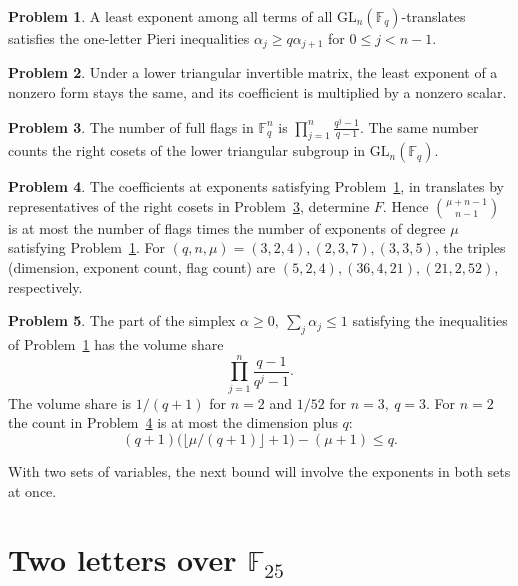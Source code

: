 \documentclass[reqno]{amsart}
\theoremstyle{plain}
\theoremstyle{definition}
\newtheorem{problem}{Problem}[section]
\theoremstyle{remark}
\newcommand{\F}{\mathbb{F}}
\newcommand{\GL}{\mathrm{GL}}
\begin{document}
\begin{problem}\label{pr:pieri-one}
A least exponent among all terms of all \(\GL_n(\F_q)\)-translates satisfies the one-letter Pieri inequalities \(\alpha_j\ge q\alpha_{j+1}\) for \(0\le j<n-1\).
\end{problem}

\begin{problem}\label{pr:triangular}
Under a lower triangular invertible matrix, the least exponent of a nonzero form stays the same, and its coefficient is multiplied by a nonzero scalar.
\end{problem}

\begin{problem}\label{pr:flags}
The number of full flags in \(\F_q^n\) is \(\prod_{j=1}^n\frac{q^j-1}{q-1}\).  The same number counts the right cosets of the lower triangular subgroup in \(\GL_n(\F_q)\).
\end{problem}

\begin{problem}\label{pr:flag-count}
The coefficients at exponents satisfying Problem~\ref{pr:pieri-one}, in translates by representatives of the right cosets in Problem~\ref{pr:flags}, determine \(F\).  Hence \(\binom{\mu+n-1}{n-1}\) is at most the number of flags times the number of exponents of degree \(\mu\) satisfying Problem~\ref{pr:pieri-one}.  For \((q,n,\mu)=(3,2,4),(2,3,7),(3,3,5)\), the triples (dimension, exponent count, flag count) are \((5,2,4),(36,4,21),(21,2,52)\), respectively.
\end{problem}

\begin{problem}\label{pr:cone-share}
The part of the simplex \(\alpha\ge0,\ \sum_j\alpha_j\le1\) satisfying the inequalities of Problem~\ref{pr:pieri-one} has the volume share
\[
  \prod_{j=1}^n\frac{q-1}{q^j-1}.
\]
The volume share is \(1/(q+1)\) for \(n=2\) and \(1/52\) for \(n=3,\ q=3\).  For \(n=2\) the count in Problem~\ref{pr:flag-count} is at most the dimension plus \(q\):
\[
  (q+1)\bigl(\lfloor \mu/(q+1)\rfloor+1\bigr)-(\mu+1)\le q.
\]
\end{problem}

With two sets of variables, the next bound will involve the exponents in both sets at once.

\section{Two letters over \texorpdfstring{\(\F_{25}\)}{F25}}\label{sec:two-letters}
\end{document}
